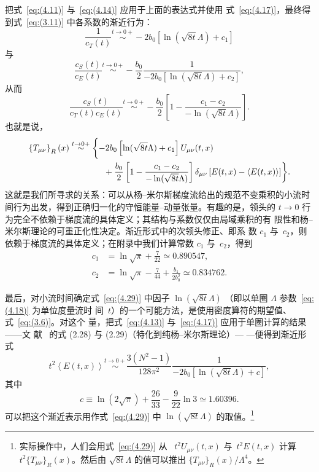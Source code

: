 把式~\eqref{eq:(4.11)} 与~\eqref{eq:(4.14)} 应用于上面的表达式并使用
式~\eqref{eq:(4.17)}，最终得到式~\eqref{eq:(3.11)} 中各系数的渐近行为：
\begin{equation}
   \frac{1}{c_T(t)}
   \stackrel{t\to0+}{\sim}
   -2b_0\left[\ln(\sqrt{8t}\Lambda)+c_1\right]
\label{eq:(4.26)}
\end{equation}
与
\begin{equation}
   \frac{c_S(t)}{c_E(t)}
   \stackrel{t\to0+}{\sim}
   -\frac{b_0}{2}
   \frac{1}{-2b_0\left[\ln(\sqrt{8t}\Lambda)+c_2\right]},
\label{eq:(4.27)}
\end{equation}
从而
\begin{equation}
   \frac{c_S(t)}{c_T(t)c_E(t)}
   \stackrel{t\to0+}{\sim}
   -\frac{b_0}{2}
   \left[1-\frac{c_1-c_2}{-\ln(\sqrt{8t}\Lambda)}\right].
\label{eq:(4.28)}
\end{equation}
也就是说，
\begin{align}
   \left\{T_{\mu\nu}\right\}_R(x)
   &\stackrel{t\to0+}{\sim}
   \biggl\{
   -2b_0\left[\ln(\sqrt{8t}\Lambda)+c_1\right]U_{\mu\nu}(t,x)
\notag\\
   &\qquad\qquad{}
   +\frac{b_0}{2}
   \left[1-\frac{c_1-c_2}{-\ln(\sqrt{8t}\Lambda)}\right]
   \delta_{\mu\nu}
   \left[
   E(t,x)-\left\langle E(t,x)\right\rangle\right]
   \biggr\}.
\label{eq:(4.29)}
\end{align}
这就是我们所寻求的关系：可以从杨--米尔斯梯度流给出的规范不变乘积的小流时
间行为出发，得到正确归一化的守恒能量--动量张量。有趣的是，领头的
$t\to0$ 行为完全不依赖于梯度流的具体定义；其结构与系数仅仅由局域乘积的有
限性和杨--米尔斯理论的可重正化性决定。渐近形式中的次领头修正、即系
数 $c_1$ 与~$c_2$，则依赖于梯度流的具体定义；在附录中我们计算常数 $c_1$
与~$c_2$，得到
\begin{align}
   c_1&=\ln\sqrt{\pi}+\frac{7}{22}
   \simeq0.890547,
\label{eq:(4.30)}
\\
   c_2&=\ln\sqrt{\pi}-\frac{7}{44}
   +\frac{b_1}{2b_0^2}
   \simeq0.834762.
\label{eq:(4.31)}
\end{align}

最后，对小流时间确定式~\eqref{eq:(4.29)} 中因子 $\ln(\sqrt{8t}\Lambda)$
（即以单圈 $\Lambda$ 参数~\eqref{eq:(4.18)} 为单位度量流时
间~$t$）的一个可能方法，是使用密度算符的期望值、式~\eqref{eq:(3.6)}。对这个
量，把式~\eqref{eq:(4.13)} 与~\eqref{eq:(4.17)} 应用于单圈计算的结果——文
献~\cite{Luscher:2010iy} 的式 (2.28) 与 (2.29)（特化到纯杨--米尔斯理论）—
—便得到渐近形式
\begin{equation}
   t^2\left\langle E(t,x)\right\rangle
   \stackrel{t\to0+}{\sim}
   \frac{3(N^2-1)}{128\pi^2}
   \frac{1}{-2b_0\left[\ln(\sqrt{8t}\Lambda)+c\right]},
\label{eq:(4.32)}
\end{equation}
其中
\begin{equation}
   c\equiv\ln(2\sqrt{\pi})+\frac{26}{33}-\frac{9}{22}\ln3
   \simeq1.60396.
\label{eq:(4.33)}
\end{equation}
可以把这个渐近表示用作式~\eqref{eq:(4.29)} 中 $\ln(\sqrt{8t}\Lambda)$
 的取值。\footnote{实际操作中，人们会用式~\eqref{eq:(4.29)} 从%
~$t^2U_{\mu\nu}(t,x)$ 与~$t^2E(t,x)$ 计算 $t^2\{T_{\mu\nu}\}_R(x)$。然后由
$\sqrt{8t}\Lambda$ 的值可以推出 $\{T_{\mu\nu}\}_R(x)/\Lambda^4$。}
